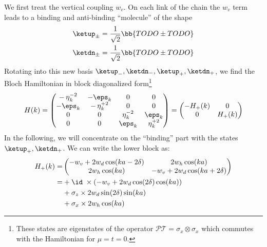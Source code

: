 We first treat the vertical coupling $w_v$. On each link of the chain the $w_v$ term leads to a binding and anti-binding ``molecule'' of the shape
\begin{align}
    \ketup_\pm = \frac{1}{\sqrt{2}} \bb{ \upp \pm \dnm } \\
    \ketdn_\pm = \frac{1}{\sqrt{2}} \bb{ \dnp \pm \upm }
\end{align}
Rotating into this new basis $\ketup_-, \ketdn_-, \ketup_+, \ketdn_+$, we find the Bloch Hamiltonian
in block diagonalized form\footnote{These states are eigenstates of the operator $\mathcal{P}\mathcal{T}=\sigma_x \otimes \sigma_x$ which commutes with the Hamiltonian for $\mu=t=0$.}
\begin{align}
    H(k) =
    \begin{pmatrix}
        -\et_k^{-2} & -\eps_k & 0 & 0 \\
        -\eps_k & -\et_k^{+2} & 0 & 0 \\
        0 & 0 & \et^{-2}_{k} & \eps_k \\
        0 & 0 & \eps_k & \et^{+2}_k
    \end{pmatrix} =
    \begin{pmatrix}
        -H_+(k) & 0 \\
        0 & H_+(k)
    \end{pmatrix}
\end{align}
In the following, we will concentrate on the ``binding'' part with the states $\ketup_+, \ketdn_+$. We can write the lower block as:
\begin{align}
    H_+(k) = &\begin{pmatrix}
        -w_v + 2w_d \cos(ka-2\delta) & 2w_h \cos(ka) \\
        2w_h\cos(ka) & -w_v + 2w_d \cos(ka+2\delta)
    \end{pmatrix} \\
    = &+\id \; \times (-w_v + 2w_d \cos(2\delta) \cos(ka)) \\
    &+\sigma_z \times 2w_d \sin(2\delta) \sin(ka) \\
    &+\sigma_x \times 2w_h \cos(ka)
\end{align}



